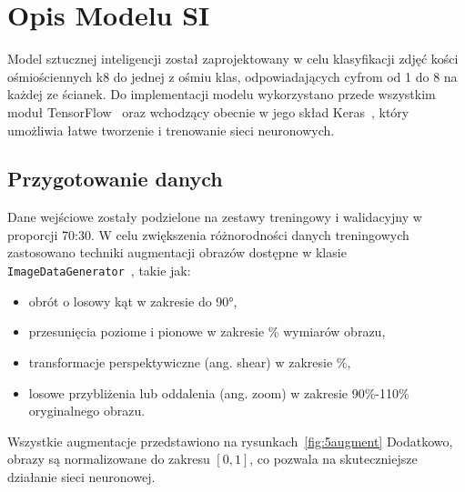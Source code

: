 \section{Opis Modelu SI}\label{sec:opis-modelu-si}

Model sztucznej inteligencji został zaprojektowany w celu klasyfikacji zdjęć kości ośmiościennych k8 do jednej z ośmiu klas,
odpowiadających cyfrom od 1 do 8 na każdej ze ścianek.
Do implementacji modelu wykorzystano przede wszystkim moduł TensorFlow~\cite{tensorflow_docs}
oraz wchodzący obecnie w jego skład Keras~\cite{keras_docs},
który umożliwia łatwe tworzenie i trenowanie sieci neuronowych.




\subsection{Przygotowanie danych}\label{subsec:przygotowanie-danych}

Dane wejściowe zostały podzielone na zestawy treningowy i walidacyjny w proporcji 70:30.
W celu zwiększenia różnorodności danych treningowych zastosowano techniki augmentacji obrazów dostępne w klasie
\texttt{ImageDataGenerator}~\cite{keras_imagedatagenerator}, takie jak:

\begin{itemize}
    \item obrót o losowy kąt w zakresie do 90°,
    \item przesunięcia poziome i pionowe w zakresie \% wymiarów obrazu,
    \item transformacje perspektywiczne (ang. shear) w zakresie \%,
    \item losowe przybliżenia lub oddalenia (ang. zoom) w zakresie 90\%-110\% oryginalnego obrazu.
\end{itemize}

Wszystkie augmentacje przedstawiono na rysunkach~\ref{fig:5augment}
Dodatkowo, obrazy są normalizowane do zakresu $[0, 1]$, co pozwala na skuteczniejsze działanie sieci neuronowej.


